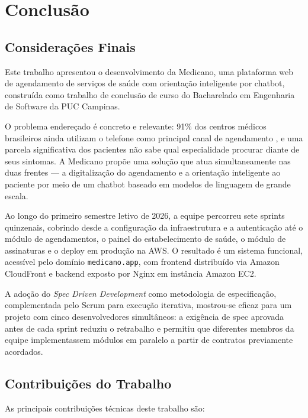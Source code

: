 \chapter{Conclusão}
\label{chap:conclusion}

\section{Considerações Finais}
\label{sec:final-considerations}

Este trabalho apresentou o desenvolvimento da Medicano,
uma plataforma web de agendamento de serviços de saúde
com orientação inteligente por chatbot, construída como
trabalho de conclusão de curso do Bacharelado em
Engenharia de Software da PUC Campinas.

O problema endereçado é concreto e relevante: 91\% dos
centros médicos brasileiros ainda utilizam o telefone
como principal canal de agendamento
\cite{doctoralia2022}, e uma parcela significativa dos
pacientes não sabe qual especialidade procurar diante
de seus sintomas. A Medicano propõe uma solução que
atua simultaneamente nas duas frentes — a digitalização
do agendamento e a orientação inteligente ao paciente
por meio de um chatbot baseado em modelos de linguagem
de grande escala.

Ao longo do primeiro semestre letivo de 2026, a equipe
percorreu sete sprints quinzenais, cobrindo desde a
configuração da infraestrutura e a autenticação até o
módulo de agendamentos, o painel do estabelecimento de saúde, o módulo
de assinaturas e o deploy em produção na AWS. O
resultado é um sistema funcional, acessível pelo
domínio \texttt{medicano.app}, com frontend distribuído
via Amazon CloudFront e backend exposto por Nginx em
instância Amazon EC2.

A adoção do \textit{Spec Driven Development} como
metodologia de especificação, complementada pelo Scrum
para execução iterativa, mostrou-se eficaz para um
projeto com cinco desenvolvedores simultâneos: a
exigência de spec aprovada antes de cada sprint reduziu
o retrabalho e permitiu que diferentes membros da
equipe implementassem módulos em paralelo a partir de
contratos previamente acordados.

\section{Contribuições do Trabalho}
\label{sec:contributions}

As principais contribuições técnicas deste trabalho são:

